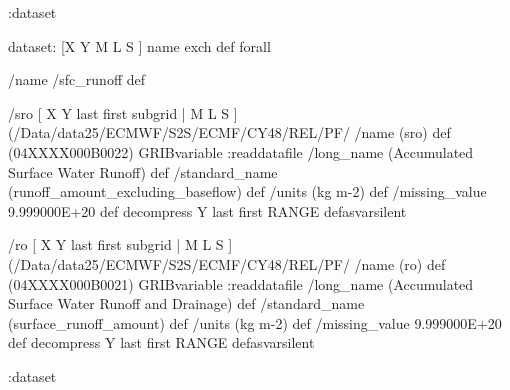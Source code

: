 \begin{ingrid}
:dataset

dataset:
[X Y M L S ] {name exch def } forall

/name /sfc_runoff def

/sro { [ X Y last first subgrid | M L S ] (/Data/data25/ECMWF/S2S/ECMF/CY48/REL/PF/%
/name (sro) def
(04XXXX000B0022) GRIBvariable
:readdatafile
/long_name (Accumulated Surface Water Runoff) def
/standard_name (runoff_amount_excluding_baseflow) def
/units (kg m-2) def
/missing_value 9.999000E+20 def
decompress
Y last first RANGE
} defasvarsilent

/ro { [ X Y last first subgrid | M L S ] (/Data/data25/ECMWF/S2S/ECMF/CY48/REL/PF/%
/name (ro) def
(04XXXX000B0021) GRIBvariable
:readdatafile
/long_name (Accumulated Surface Water Runoff and Drainage) def
/standard_name (surface_runoff_amount) def
/units (kg m-2) def
/missing_value 9.999000E+20 def
decompress
Y last first RANGE
} defasvarsilent

:dataset


\end{ingrid}
